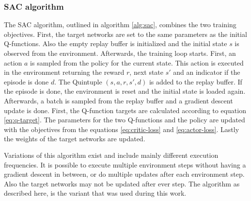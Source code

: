 \subsubsection{SAC algorithm}
\label{sec:preliminaries:rl:sac-algo}

The SAC algorithm, outlined in algorithm \ref{alg:sac}, combines the two training objectives. First, the target networks are set to the same parameters as the initial Q-functions. Also the empty replay buffer is initialized and the initial state $s$ is observed from the environment. Afterwards, the training loop starts. First, an action $a$ is sampled from the policy for the current state. This action is executed in the environment returning the reward $r$, next state $s'$ and an indicator if the episode is done $d$. The Quintuple $(s,a,r,s',d)$ is added to the replay buffer. If the episode is done, the environment is reset and the initial state is loaded again. Afterwards, a batch is sampled from the replay buffer and a gradient descent update is done. First, the Q-function targets are calculated according to equation \ref{eq:q-target}. The parameters for the two Q-functions and the policy are updated with the objectives from the equations \ref{eq:critic-loss} and \ref{eq:actor-loss}. Lastly the weights of the target networks are updated.

Variations of this algorithm exist and include mainly different execution frequencies. It is possible to execute multiple environment steps without having a gradient descent in between, or do multiple updates after each environment step. Also the target networks may not be updated after ever step. The algorithm as described here, is the variant that was used during this work.

